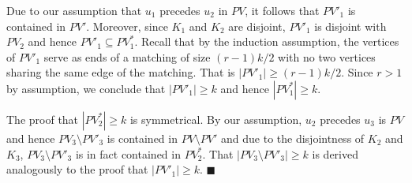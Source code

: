 \documentclass{article}
\begin{document}
Due to our assumption that $u_1$ precedes $u_2$ in $PV$, it follows that $PV'_1$ is contained in $PV'$.
Moreover, since $K_1$ and $K_2$ are disjoint, $PV'_1$ is disjoint with $PV_2$ and hence $PV'_1 \subseteq PV^*_1$.
Recall that by the induction assumption, the vertices of $PV'_1$ serve as ends
of a matching of size $(r-1)k/2$ with no two vertices sharing the same edge of the matching.
That is $|PV'_1| \geq (r-1)k/2$. Since $r>1$ by assumption, we conclude that $|PV'_1| \geq k$ and
hence $|PV^*_1| \geq k$.

The proof that $|PV^*_2| \geq k$ is symmetrical. By our assumption, $u_2$ precedes $u_3$ is $PV$ and
hence $PV_3 \setminus PV'_3$ is contained in $PV \setminus PV'$ and due to the disjointness of $K_2$ and
$K_3$, $PV_3 \setminus PV'_3$ is in fact contained in $PV^*_2$. That $|PV_3 \setminus PV'_3| \geq k$
is derived analogously to the proof that $|PV'_1| \geq k$. $\blacksquare$
\end{document}
